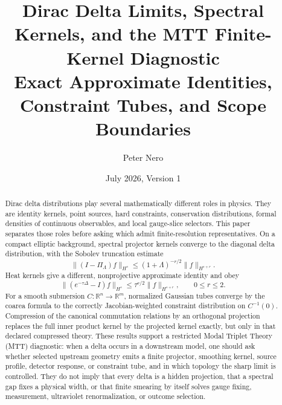 \documentclass[11pt]{article}
\title{Dirac Delta Limits, Spectral Kernels, and the MTT Finite-Kernel Diagnostic\\
\large Exact Approximate Identities, Constraint Tubes, and Scope Boundaries}
\author{Peter Nero}
\date{July 2026, Version 1}
\begin{document}
\maketitle

\begin{abstract}
Dirac delta distributions play several mathematically different roles in
physics. They are identity kernels, point sources, hard constraints,
conservation distributions, formal densities of continuous observables, and
local gauge-slice selectors. This paper separates those roles before asking
which admit finite-resolution representatives. On a compact elliptic
background, spectral projector kernels converge to the diagonal delta
distribution, with the Sobolev truncation estimate
\[
\|(I-\Pi_\Lambda)f\|_{H^s}
\leq (1+\Lambda)^{-r/2}\|f\|_{H^{s+r}}.
\]
Heat kernels give a different, nonprojective approximate identity and obey
\[
\|(e^{-\tau\Delta}-I)f\|_{H^s}
\leq \tau^{r/2}\|f\|_{H^{s+r}},
\qquad 0\leq r\leq2.
\]
For a smooth submersion \(C:\mathbb R^n\to\mathbb R^m\), normalized Gaussian
tubes converge by the coarea formula to the correctly Jacobian-weighted
constraint distribution on \(C^{-1}(0)\). Compression of the canonical
commutation relations by an orthogonal projection replaces the full inner
product kernel by the projected kernel exactly, but only in that declared
compressed theory. These results support a restricted Modal Triplet Theory
(MTT) diagnostic: when a delta occurs in a downstream model, one should ask
whether selected upstream geometry emits a finite projector, smoothing
kernel, source profile, detector response, or constraint tube, and in which
topology the sharp limit is controlled. They do not imply that every delta is
a hidden projection, that a spectral gap fixes a physical width, or that
finite smearing by itself solves gauge fixing, measurement, ultraviolet
renormalization, or outcome selection.
\end{abstract}
\end{document}
